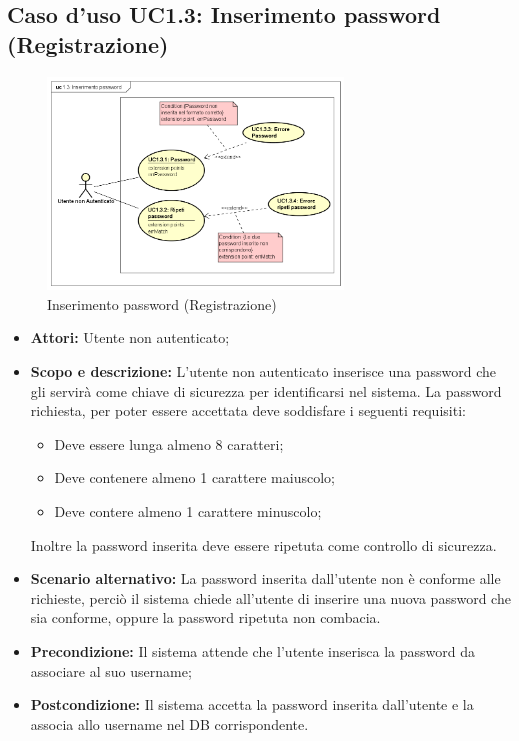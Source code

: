 \documentclass[12pt,a4paper,titlepage]{article}
\begin{document}
\subsection{Caso d'uso UC1.3: Inserimento password (Registrazione)}
\begin{figure}[H]
	\centering
	\includegraphics[width=0.7\textwidth]{UseCase/InserimentoPassword}
	\caption{Inserimento password (Registrazione)}
\end{figure}
\begin{itemize}
	\item \textbf{Attori: }Utente non autenticato;
	\item \textbf{Scopo e descrizione: } L'utente non autenticato inserisce una password che gli servirà come chiave di sicurezza per identificarsi nel sistema. La password richiesta, per poter essere accettata deve soddisfare i seguenti requisiti: 
	\begin{itemize}
		\item Deve essere lunga almeno 8 caratteri; 
		\item Deve contenere almeno 1 carattere maiuscolo; 
		\item Deve contere almeno 1 carattere minuscolo;
	\end{itemize}
	Inoltre la password inserita deve essere ripetuta come controllo di sicurezza.
	\item \textbf{Scenario alternativo: }La password inserita dall'utente non è conforme alle richieste, perciò il sistema chiede all'utente di inserire una nuova password che sia conforme, oppure la password ripetuta non combacia.
	\item \textbf{Precondizione: }Il sistema attende che l'utente inserisca la password da associare al suo username;
	\item \textbf{Postcondizione: }Il sistema accetta la password inserita dall'utente e la associa allo username nel DB corrispondente.
\end{itemize}
\end{document}

